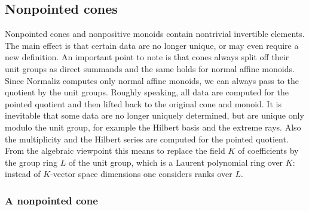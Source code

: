\subsection{Nonpointed cones}\label{Nonpointed}

Nonpointed cones and nonpositive monoids contain nontrivial invertible elements. The main effect is that certain data are no longer unique, or may even require a new definition. An important point to note is that cones always split off their unit groups as direct summands and the same holds for normal affine monoids. Since Normaliz computes only normal affine monoids, we can always pass to the quotient by the unit groups. Roughly speaking, all data are computed for the pointed quotient and then lifted back to the original cone and monoid. It is inevitable that some data are no longer uniquely determined, but are unique only modulo the unit group, for example the Hilbert basis and the extreme rays. Also the multiplicity and the Hilbert series are computed for the pointed quotient. From the algebraic viewpoint this means to replace the field $K$ of coefficients by the group ring $L$ of the unit group, which is a Laurent polynomial ring over $K$: instead of $K$-vector space dimensions one considers ranks over $L$.

\subsubsection{A nonpointed cone}

